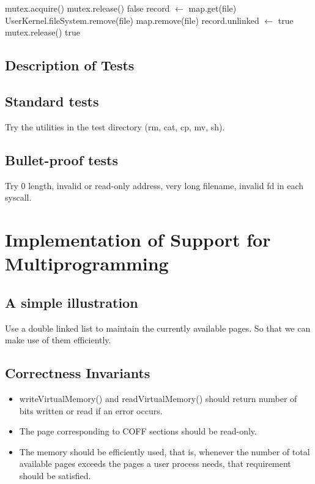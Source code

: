\documentclass{article}
\begin{document}
	\begin{algorithm}[H]
		\begin{algorithmic}
			\State mutex.acquire()
			\State mutex.release()
			\State \Return false
			\Else
			\State record $\leftarrow$ map.get(file)
			\State UserKernel.fileSystem.remove(file)
			\State map.remove(file)
			\Else
			\State record.unlinked $\leftarrow$ true
			\EndIf
			\State mutex.release()
			\State \Return true
			\EndIf
			\EndProcedure
		\end{algorithmic}
	\end{algorithm}
	\subsection{Description of Tests}
	\subsection*{Standard tests}
	Try the utilities in the test directory (rm, cat, cp, mv, sh).
	
	\subsection*{Bullet-proof tests}
	Try 0 length, invalid or read-only address, very long filename, invalid fd in each syscall.

	\section{Implementation of Support for Multiprogramming}
	\subsection{A simple illustration}
	Use a double linked list to maintain the currently available pages. So that we can make use of them efficiently.
	\subsection{Correctness Invariants}
	\begin{itemize}
		\item writeVirtualMemory() and readVirtualMemory() should return number of bits written or read if an error occurs.
		\item The page corresponding to COFF sections should be read-only.
		\item The memory should be efficiently used, that is, whenever the number of total available pages exceeds the pages a user process needs, that requirement should be satisfied.
	\end{itemize}
\end{document}
